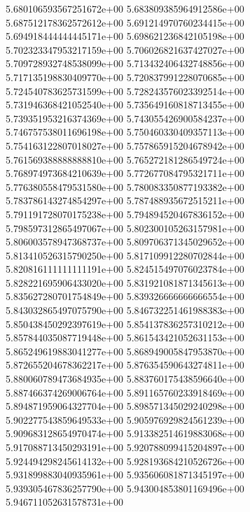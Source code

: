 5.680106593567251672e+00	5.683809385964912586e+00	5.687512178362572612e+00	5.691214970760234415e+00	5.694918444444445171e+00	5.698621236842105198e+00	5.702323347953217159e+00	5.706026821637427027e+00	5.709728932748538099e+00	5.713432406432748856e+00	5.717135198830409770e+00	5.720837991228070685e+00	5.724540783625731599e+00	5.728243576023392514e+00	5.731946368421052540e+00	5.735649160818713455e+00	5.739351953216374369e+00	5.743055426900584237e+00	5.746757538011696198e+00	5.750460330409357113e+00	5.754163122807018027e+00	5.757865915204678942e+00	5.761569388888888810e+00	5.765272181286549724e+00	5.768974973684210639e+00	5.772677084795321711e+00	5.776380558479531580e+00	5.780083350877193382e+00	5.783786143274854297e+00	5.787488935672515211e+00	5.791191728070175238e+00	5.794894520467836152e+00	5.798597312865497067e+00	5.802300105263157981e+00	5.806003578947368737e+00	5.809706371345029652e+00	5.813410526315790250e+00	5.817109912280702844e+00	5.820816111111111191e+00	5.824515497076023784e+00	5.828221695906433020e+00	5.831921081871345613e+00	5.835627280701754849e+00	5.839326666666666554e+00	5.843032865497075790e+00	5.846732251461988383e+00	5.850438450292397619e+00	5.854137836257310212e+00	5.857844035087719448e+00	5.861543421052631153e+00	5.865249619883041277e+00	5.868949005847953870e+00	5.872655204678362217e+00	5.876354590643274811e+00	5.880060789473684935e+00	5.883760175438596640e+00	5.887466374269006764e+00	5.891165760233918469e+00	5.894871959064327704e+00	5.898571345029240298e+00	5.902277543859649533e+00	5.905976929824561239e+00	5.909683128654970474e+00	5.913382514619883068e+00	5.917088713450293191e+00	5.920788099415204897e+00	5.924494298245614132e+00	5.928193684210526726e+00	5.931899883040935961e+00	5.935606081871345197e+00	5.939305467836257790e+00	5.943004853801169496e+00	5.946711052631578731e+00
